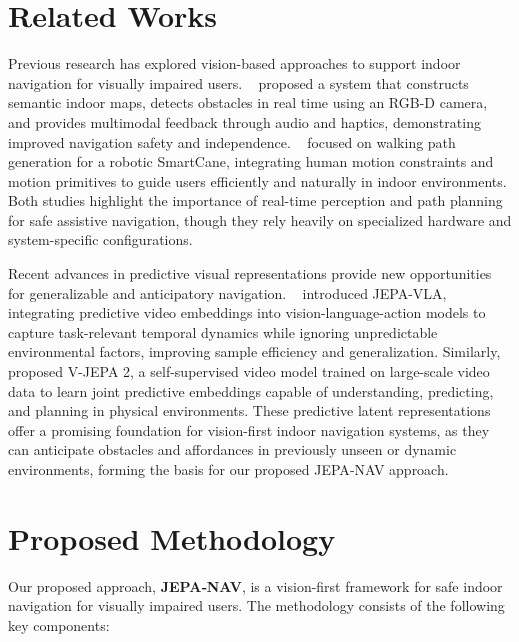 \documentclass{article}
\begin{document}

\section{Related Works}

Previous research has explored vision-based approaches to support indoor navigation for visually impaired users. ~\cite{li2018vision} proposed a system that constructs semantic indoor maps, detects obstacles in real time using an RGB-D camera, and provides multimodal feedback through audio and haptics, demonstrating improved navigation safety and independence. ~\cite{na2024improving} focused on walking path generation for a robotic SmartCane, integrating human motion constraints and motion primitives to guide users efficiently and naturally in indoor environments. Both studies highlight the importance of real-time perception and path planning for safe assistive navigation, though they rely heavily on specialized hardware and system-specific configurations.

Recent advances in predictive visual representations provide new opportunities for generalizable and anticipatory navigation. ~\cite{miao_jepa-vla_2026} introduced JEPA-VLA, integrating predictive video embeddings into vision-language-action models to capture task-relevant temporal dynamics while ignoring unpredictable environmental factors, improving sample efficiency and generalization. Similarly, ~\cite{assran2025v} proposed V-JEPA 2, a self-supervised video model trained on large-scale video data to learn joint predictive embeddings capable of understanding, predicting, and planning in physical environments. These predictive latent representations offer a promising foundation for vision-first indoor navigation systems, as they can anticipate obstacles and affordances in previously unseen or dynamic environments, forming the basis for our proposed JEPA‑NAV approach.

\section{Proposed Methodology}

Our proposed approach, \textbf{JEPA‑NAV}, is a vision-first framework for safe indoor navigation for visually impaired users. The methodology consists of the following key components:
\end{document}
